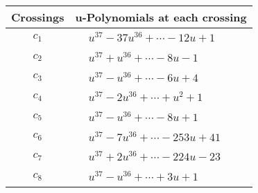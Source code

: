 \documentclass[1p]{elsarticle_modified}
\theoremstyle{definition}
\begin{document}
\begin{tabular}{m{50pt}|m{274pt}}
Crossings & \hspace{64pt}u-Polynomials at each crossing \\
\hline $$\begin{aligned}c_{1}\end{aligned}$$&$\begin{aligned}
&u^{37}-37 u^{36}+\cdots-12 u+1
\end{aligned}$\\
\hline $$\begin{aligned}c_{2}\end{aligned}$$&$\begin{aligned}
&u^{37}+u^{36}+\cdots-8 u-1
\end{aligned}$\\
\hline $$\begin{aligned}c_{3}\end{aligned}$$&$\begin{aligned}
&u^{37}- u^{36}+\cdots-6 u+4
\end{aligned}$\\
\hline $$\begin{aligned}c_{4}\end{aligned}$$&$\begin{aligned}
&u^{37}-2 u^{36}+\cdots+u^2+1
\end{aligned}$\\
\hline $$\begin{aligned}c_{5}\end{aligned}$$&$\begin{aligned}
&u^{37}- u^{36}+\cdots-8 u+1
\end{aligned}$\\
\hline $$\begin{aligned}c_{6}\end{aligned}$$&$\begin{aligned}
&u^{37}-7 u^{36}+\cdots-253 u+41
\end{aligned}$\\
\hline $$\begin{aligned}c_{7}\end{aligned}$$&$\begin{aligned}
&u^{37}+2 u^{36}+\cdots-224 u-23
\end{aligned}$\\
\hline $$\begin{aligned}c_{8}\end{aligned}$$&$\begin{aligned}
&u^{37}- u^{36}+\cdots+3 u+1
\end{aligned}$\\

\end{tabular}
\end{document}

